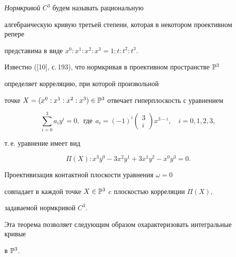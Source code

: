 \begin{defn}


{\it Нормкривой} $C^3$ будем называть рациональную 


алгебраическую кривую третьей степени, которая в некотором проективном репере 


представима в виде $x^0:x^1:x^2:x^3=1:t:t^2:t^3$.


\end{defn}





Известно ([10], с.\,193), что нормкривая в проективном пространстве $\Bbb{P}^3$ 


определяет корреляцию, при которой произвольной 


точке $X=(x^0:x^1:x^2:x^3)\in\Bbb{P}^3$ отвечает гиперплоскость с уравнением


$$


\sum_{i=0}^{3}a_{i}y^{i}=0,\ \ \text{где} \ \


a_{i}=(-1)^{i}


\begin{pmatrix}3\\i\end{pmatrix}


x^{3-i},\quad i=0,1,2,3,


$$


т.\,е. уравнение имеет вид


$$


\Pi(X): x^3y^0-3x^2y^1+3x^1y^2-x^0y^3=0.


$$








\begin{thm}


Проективизация контактной плоскости уравнения $\omega=0$


совпадает в каждой точке $X\in\Bbb{P}^3$ c плоскостью корреляции $\Pi(X)$, 


задаваемой нормкривой $C^3$.


\end{thm}





Эта теорема позволяет следующим образом охарактеризовать интегральные кривые 


в $\Bbb{P}^3$.








